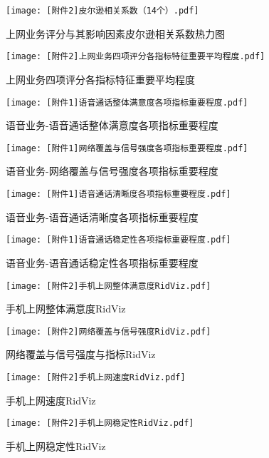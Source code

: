 \documentclass{MathorCupmodeling}
\begin{document}
	\begin{figure}[H]
		\centerline{\texttt{[image: [附件2]皮尔逊相关系数（14个）.pdf]}}
		\caption{上网业务评分与其影响因素皮尔逊相关系数热力图}\label{fig:a2perason}
	\end{figure}
	\begin{figure}[H]
		\centerline{\texttt{[image: [附件2]上网业务四项评分各指标特征重要平均程度.pdf]}}
		\caption{上网业务四项评分各指标特征重要平均程度}\label{fig:a2allRF}
		\end{figure}
	\begin{figure}[H]
		\centerline{\texttt{[image: [附件1]语音通话整体满意度各项指标重要程度.pdf]}}
		\caption{语音业务-语音通话整体满意度各项指标重要程度}\label{fig:a1FirstRF}
	\end{figure}
	\begin{figure}[H]
		\centerline{\texttt{[image: [附件1]网络覆盖与信号强度各项指标重要程度.pdf]}}
		\caption{语音业务-网络覆盖与信号强度各项指标重要程度}\label{fig:a1SecondRF}
	\end{figure}
	\begin{figure}[H]
		\centerline{\texttt{[image: [附件1]语音通话清晰度各项指标重要程度.pdf]}}
		\caption{语音业务-语音通话清晰度各项指标重要程度}\label{fig:a1ThirdRF}
	\end{figure}
	\begin{figure}[H]
		\centerline{\texttt{[image: [附件1]语音通话稳定性各项指标重要程度.pdf]}}
		\caption{语音业务-语音通话稳定性各项指标重要程度}\label{fig:a1FourthRF}
	\end{figure}

	\begin{figure}[H]
		\centering
		\begin{minipage}{0.49\linewidth}
			\centering
			\texttt{[image: [附件2]手机上网整体满意度RidViz.pdf]}
			\caption{手机上网整体满意度RidViz}
			\label{fig:a2FirstRid}
		\end{minipage}
		\begin{minipage}{0.49\linewidth}
			\centering
			\texttt{[image: [附件2]网络覆盖与信号强度RidViz.pdf]}
			\caption{网络覆盖与信号强度与指标RidViz}
			\label{fig:a2SecondRid}
		\end{minipage}
		
		\begin{minipage}{0.49\linewidth}
			\centering
			\texttt{[image: [附件2]手机上网速度RidViz.pdf]}
			\caption{手机上网速度RidViz}
			\label{fig:a2ThirdRid}
		\end{minipage}
		\begin{minipage}{0.49\linewidth}
			\centering
			\texttt{[image: [附件2]手机上网稳定性RidViz.pdf]}
			\caption{手机上网稳定性RidViz}
			\label{fig:a2FourthRid}
		\end{minipage}
	\end{figure}
\end{document}
